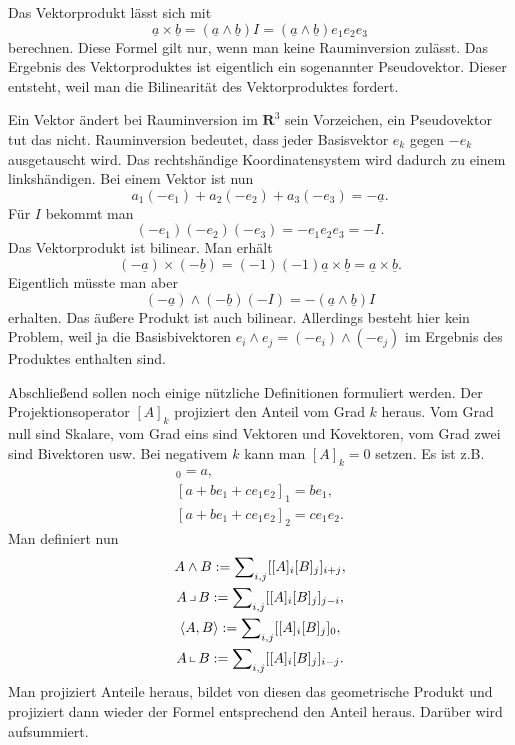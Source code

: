 \documentclass[a4paper,10pt,fleqn,twocolumn,twoside]{article}
\begin{document}
Das Vektorprodukt lässt sich mit
\[\underline a\times\underline b = (\underline a\wedge\underline b)I
= (\underline a\wedge\underline b)e_1e_2e_3\]
\noindent
berechnen. Diese Formel gilt nur, wenn man keine Rauminversion
zulässt. Das Ergebnis des Vektorproduktes ist eigentlich ein
sogenannter Pseudovektor. Dieser entsteht, weil man die
Bilinearität des Vektorproduktes fordert.

Ein Vektor ändert bei Rauminversion im $\mathbf R^3$ sein
Vorzeichen, ein Pseudovektor tut das nicht. Rauminversion bedeutet,
dass jeder Basisvektor $e_k$ gegen $-e_k$ ausgetauscht wird.
Das rechtshändige Koordinatensystem wird dadurch zu einem
linkshändigen. Bei einem Vektor ist nun
\[a_1(-e_1)+a_2(-e_2)+a_3(-e_3) = -\underline a.\]
Für $I$ bekommt man
\[(-e_1)(-e_2)(-e_3) = -e_1e_2e_3 = -I.\]
Das Vektorprodukt ist bilinear. Man erhält
\[(-\underline a)\times (-\underline b)
= (-1)(-1)\underline a\times\underline b
= \underline a\times\underline b.\]
Eigentlich müsste man aber
\[(-\underline a)\wedge (-\underline b)(-I)
= -(\underline a\wedge\underline b)I\]
erhalten. Das äußere Produkt ist auch bilinear. Allerdings besteht
hier kein Problem, weil ja die Basisbivektoren
$e_i\wedge e_j = (-e_i)\wedge(-e_j)$ im Ergebnis des Produktes
enthalten sind.

Abschließend sollen noch einige nützliche Definitionen formuliert
werden. Der Projektionsoperator $[A]_k$ projiziert den Anteil
vom Grad $k$ heraus. Vom Grad null sind Skalare, vom Grad eins
sind Vektoren und Kovektoren, vom Grad zwei sind Bivektoren
usw. Bei negativem $k$ kann man $[A]_k=0$ setzen.
Es ist z.B.
\begin{gather*}
[a+be_1+ce_1e_2]_0 = a,\\
[a+be_1+ce_1e_2]_1 = be_1,\\
[a+be_1+ce_1e_2]_2 = ce_1e_2.
\end{gather*}
Man definiert nun
\begin{gather*}
A\wedge B := \sum\nolimits_{i,j} [[A]_i[B]_j]_{i+j},\\
A\,\big\lrcorner\,B := \sum\nolimits_{i,j} [[A]_i[B]_j]_{j-i},\\
\langle A,B\rangle := \sum\nolimits_{i,j} [[A]_i[B]_j]_0,\\
A\,\big\llcorner\,B := \sum\nolimits_{i,j} [[A]_i[B]_j]_{i-j}.
\end{gather*}
Man projiziert Anteile heraus, bildet von diesen das geometrische
Produkt und projiziert dann wieder der Formel entsprechend den Anteil
heraus. Darüber wird aufsummiert.
\end{document}
